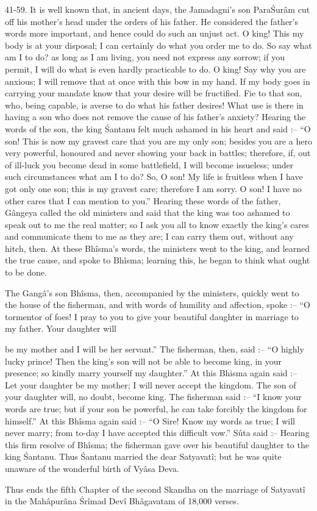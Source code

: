 41-59. It is well known that, in ancient days, the Jamadagni's son Para\'Sur\^am cut off his mother's head under the orders of his father. He considered the father's words more important, and hence could do such an unjust act. O king! This my body is at your disposal; I can certainly do what you order me to do. So say what am I to do? as long as I am living, you need not express any sorrow; if you permit, I will do what is even hardly practicable to do. O king! Say why you are anxious; I will remove that at once with this bow in my hand. If my body goes in carrying your mandate know that your desire will be fructified. Fie to that son, who, being capable, is averse to do what his father desires! What use is there in having a son who does not remove the cause of his father's anxiety? Hearing the words of the son, the king \'Santanu felt much ashamed in his heart and said :-- ``O son! This is now my gravest care that you are my only son; besides you are a hero very powerful, honoured and never showing your back in battles; therefore, if, out of ill-luck you become dead in some battlefield, I will become issueless; under such circumstances what am I to do? So, O son! My life is fruitless when I have got only one son; this is my gravest care; therefore I am sorry. O son! I have no other cares that I can mention to you.'' Hearing these words of the father, G\^angeya called the old ministers and said that the king was too ashamed to speak out to me the real matter; so I ask you all to know exactly the king's cares and communicate them to me as they are; I can carry them out, without any hitch, then. At these Bh\^isma's words, the ministers went to the king, and learned the true cause, and spoke to Bh\^isma; learning this, he began to think what ought to be done.

The Gang\^a's son Bh\^isma, then, accompanied by the ministers, quickly went to the house of the fisherman, and with words of humility and affection, spoke :-- ``O tormentor of foes! I pray to you to give your beautiful daughter in marriage to my father. Your daughter will

be my mother and I will be her servant.'' The fisherman, then, said :-- ``O highly lucky prince! Then the king's son will not be able to become king, in your presence; so kindly marry yourself my daughter.'' At this Bhisma again said :-- Let your daughter be my mother; I will never accept the kingdom. The son of your daughter will, no doubt, become king. The fisherman said :-- ``I know your words are true; but if your son be powerful, he can take forcibly the kingdom for himself.'' At this Bh\^isma again said :-- ``O Sire! Know my words as true; I will never marry; from to-day I have accepted this difficult vow.'' S\^uta said :-- Hearing this firm resolve of Bh\^isma; the fisherman gave over his beautiful daughter to the king \'Santanu. Thus \'Santanu married the dear Satyavat\^i; but he was quite unaware of the wonderful birth of Vy\^asa Deva.

Thus ends the fifth Chapter of the second Skandha on the marriage of Satyavat\^i in the Mah\^apur\^ana \'Sr\^imad Dev\^i Bh\^agavatam of 18,000 verses.

